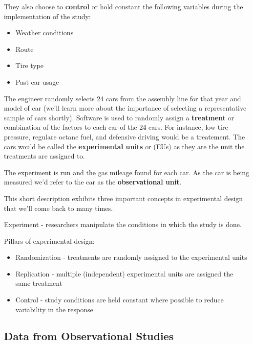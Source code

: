 \documentclass[]{book}
\providecommand{\tightlist}{%
  \setlength{\itemsep}{0pt}\setlength{\parskip}{0pt}}
\theoremstyle{definition}
\theoremstyle{definition}
\theoremstyle{definition}
\theoremstyle{remark}
\let\BeginKnitrBlock\begin \let\EndKnitrBlock\end
\begin{document}
They also choose to \textbf{control} or hold constant the following
variables during the implementation of the study:

\begin{itemize}
\tightlist
\item
  Weather conditions\\
\item
  Route\\
\item
  Tire type\\
\item
  Past car usage
\end{itemize}

The engineer randomly selects 24 cars from the assembly line for that
year and model of car (we'll learn more about the importance of
selecting a representative sample of cars shortly). Software is used to
randomly assign a \textbf{treatment} or combination of the factors to
each car of the 24 cars. For instance, low tire pressure, regulare
octane fuel, and defensive driving would be a treatement. The cars would
be called the \textbf{experimental units} or (EUs) as they are the unit
the treatments are assigned to.

The experiment is run and the gas mileage found for each car. As the car
is being measured we'd refer to the car as the \textbf{observational
unit}.

This short description exhibits three important concepts in experimental
design that we'll come back to many times.

\BeginKnitrBlock{definition}
Experiment - researchers manipulate the conditions in which the study is
done.
\EndKnitrBlock{definition}

Pillars of experimental design:

\begin{itemize}
\tightlist
\item
  Randomization - treatments are randomly assigned to the experimental
  units\\
\item
  Replication - multiple (independent) experimental units are assigned
  the same treatment\\
\item
  Control - study conditions are held constant where possible to reduce
  variability in the response
\end{itemize}

\subsection{Data from Observational
Studies}\label{data-from-observational-studies}
\end{document}
